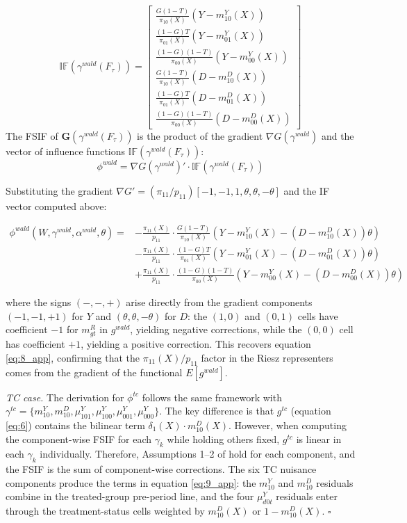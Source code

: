 \begin{propproof}
\[
    \mathbb{IF}(\gamma^{wald}(F_{\tau})) =
\begin{bmatrix}
    \frac{G(1-T)}{\pi_{10}(X)}(Y-m^Y_{10}(X)) \\
    \frac{(1-G)T}{\pi_{01}(X)}(Y-m^Y_{01}(X)) \\
    \frac{(1-G)(1-T)}{\pi_{00}(X)}(Y-m^Y_{00}(X)) \\
    \frac{G(1-T)}{\pi_{10}(X)}(D-m^D_{10}(X)) \\
    \frac{(1-G)T}{\pi_{01}(X)}(D-m^D_{01}(X)) \\
    \frac{(1-G)(1-T)}{\pi_{00}(X)}(D-m^D_{00}(X))
\end{bmatrix}
\]
The FSIF of $\mathbf{G}(\gamma^{wald}(F_{\tau}))$ is the product of the gradient $\nabla G(\gamma^{wald})$ and the vector of influence functions $\mathbb{IF}(\gamma^{wald}(F_\tau))$:
$$\phi^{wald} = \nabla G(\gamma^{wald})' \cdot \mathbb{IF}(\gamma^{wald}(F_\tau))$$

Substituting the gradient $\nabla G' = (\pi_{11}/p_{11})[-1,-1,1,\theta,\theta,-\theta]$ and the IF vector computed above:

\begin{equation*}
    \begin{aligned}
        \phi^{wald}(W,\gamma^{wald},\alpha^{wald},\theta) = & -\frac{\pi_{11}(X)}{p_{11}} \cdot \frac{G(1-T)}{\pi_{10}(X)} (Y-m^Y_{10}(X)- (D-m^D_{10}(X))\theta) \\
        & - \frac{\pi_{11}(X)}{p_{11}} \cdot \frac{(1-G)T}{\pi_{01}(X)}(Y-m^Y_{01}(X)- (D-m^D_{01}(X))\theta) \\
        & + \frac{\pi_{11}(X)}{p_{11}} \cdot \frac{(1-G)(1-T)}{\pi_{00}(X)} (Y-m^Y_{00}(X)- (D-m^D_{00}(X))\theta)
    \end{aligned}
    \end{equation*}

\noindent where the signs $(-, -, +)$ arise directly from the gradient components $(-1, -1, +1)$ for $Y$ and $(\theta, \theta, -\theta)$ for $D$: the $(1,0)$ and $(0,1)$ cells have coefficient $-1$ for $m^R_{gt}$ in $g^{wald}$, yielding negative corrections, while the $(0,0)$ cell has coefficient $+1$, yielding a positive correction. This recovers equation \ref{eq:8_app}, confirming that the $\pi_{11}(X)/p_{11}$ factor in the Riesz representers comes from the gradient of the functional $E[g^{wald}]$.

\medskip
\noindent\textit{TC case.} The derivation for $\phi^{tc}$ follows the same framework with $\gamma^{tc} = \{m^Y_{10}, m^D_{10}, \mu^Y_{101}, \mu^Y_{100}, \mu^Y_{001}, \mu^Y_{000}\}$. The key difference is that $g^{tc}$ (equation \ref{eq:6}) contains the bilinear term $\delta_1(X) \cdot m^D_{10}(X)$. However, when computing the component-wise FSIF for each $\gamma_k$ while holding others fixed, $g^{tc}$ is linear in each $\gamma_k$ individually. Therefore, Assumptions 1--2 of \cite{ichimura2022influence} hold for each component, and the FSIF is the sum of component-wise corrections. The six TC nuisance components produce the terms in equation \ref{eq:9_app}: the $m^Y_{10}$ and $m^D_{10}$ residuals combine in the treated-group pre-period line, and the four $\mu^Y_{d0t}$ residuals enter through the treatment-status cells weighted by $m^D_{10}(X)$ or $1-m^D_{10}(X)$. $\square$


\end{propproof}
